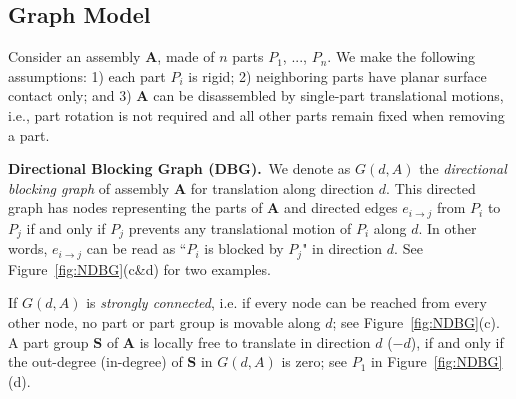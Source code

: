 \subsection{Graph Model}
\label{subsec: graphmodel}


Consider an assembly $\mathbf{A}$, made of $n$ parts $P_1$, $...$, $P_n$.
We make the following assumptions:
1) each part $P_i$ is rigid; 
2) neighboring parts have planar surface contact only; and 
3) $\mathbf{A}$ can be disassembled by single-part translational motions, i.e., part rotation is not required and all other parts remain fixed when removing a part.



\vspace*{1.0mm}
\noindent
{\bf Directional Blocking Graph (DBG).}\  
We denote as $G(d, A)$ the {\em directional blocking graph} of assembly $\mathbf{A}$ for translation along direction $d$. 
This directed graph has nodes representing the parts of $\mathbf{A}$ and directed edges $e_{i \rightarrow j}$ from $P_i$ to $P_j$  if and only if $P_j$ prevents any translational motion of $P_i$ along $d$. 
In other words, $e_{i \rightarrow j}$ can be read as ``$P_i$  is blocked by $P_j$" in direction $d$. 
See Figure~\ref{fig:NDBG}(c\&d) for two examples.

If $G(d, A)$ is {\em strongly connected}, i.e. if every node can be reached from every other node, no part or part group is movable along $d$; see Figure~\ref{fig:NDBG}(c). 
A part group $\mathbf{S}$ of $\mathbf{A}$ is locally free to translate in direction $d$ ($-d$), if and only if the out-degree (in-degree) of $\mathbf{S}$ in $G(d, A)$ is zero; see $P_1$ in Figure~\ref{fig:NDBG}(d).


